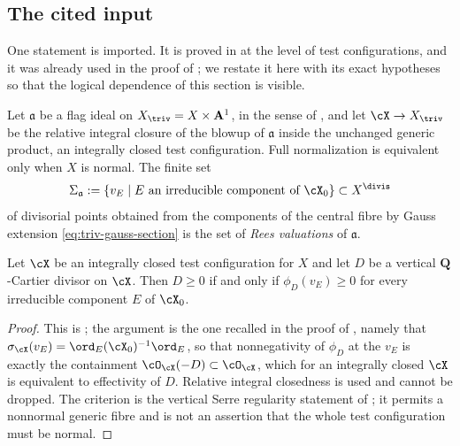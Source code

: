 \subsection{The cited input}
\label{sec:ch35-cited-input}

One statement is imported.  It is proved in
 at the level of test configurations, and
it was already used in the proof of
; we restate it here with its exact
hypotheses so that the logical dependence of this section is visible.

\begin{definition}
\label{def:ch35-rees-valuations}
Let $\mathfrak a$ be a flag ideal on $X_{\triv}=X\times\mathbf A^1$, in
the sense of , and let
$\cX\to X_{\triv}$ be the relative integral closure of the blowup of $\mathfrak a$
inside the unchanged generic product, an integrally closed test configuration.
Full normalization is equivalent only when $X$ is normal.  The finite set
\begin{equation}
\label{eq:ch35-rees-set}
 \Sigma_{\mathfrak a}
 :=\{v_E\mid E\ \text{an irreducible component of}\ \cX_0\}
 \subset X^{\divis}
\end{equation}
of divisorial points obtained from the components of the central fibre by
Gauss extension \eqref{eq:triv-gauss-section} is the set of \emph{Rees
valuations} of $\mathfrak a$.
\end{definition}

\begin{proposition}
\label{prop:ch35-effectivity}
Let $\cX$ be an integrally closed test configuration for $X$ and let
$D$ be a vertical $\mathbf Q$-Cartier divisor on $\cX$.  Then
$D\geq0$ if and only if $\phi_D(v_E)\geq0$ for every irreducible
component $E$ of $\cX_0$.
\end{proposition}

\begin{proof}
This is \cite[Lemmas~1.23 and~2.8]{BJ22}; the argument is the one recalled
in the proof of , namely that
$\sigma_{\cX}(v_E)=\ord_E(\cX_0)^{-1}\ord_E$, so that nonnegativity of
$\phi_D$ at the $v_E$ is exactly the containment
$\cO_{\cX}(-D)\subset\cO_{\cX}$, which for an integrally closed
$\cX$ is equivalent to effectivity of $D$.  Relative integral closedness is used and cannot be dropped. The criterion
is the vertical Serre regularity statement of ;
it permits a nonnormal generic fibre and is not an assertion that the
whole test configuration must be normal.
\end{proof}

